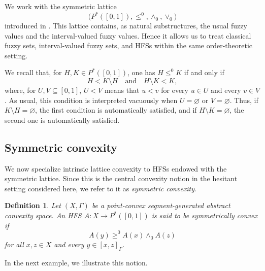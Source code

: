 \documentclass[11pt,a4paper]{article}
\newtheorem{definition}{Definition}
\begin{document}
\smallskip

We work with the symmetric lattice
\[
\bigl(P^*([0,1]),\leq^0,\wedge_0,\vee_0\bigr)
\]
introduced in \citep{JMNS22}. This lattice contains, as natural substructures, the usual fuzzy values and the interval-valued fuzzy values. Hence it allows us to treat classical fuzzy sets, interval-valued fuzzy sets, and HFSs within the same order-theoretic setting.

\smallskip

We recall that, for \(H,K\in P^*([0,1])\), one has \(H\leq^0 K\) if and only if
\[
H<K\setminus H
\quad\text{and}\quad
H\setminus K<K,
\]
where, for \(U,V\subseteq[0,1]\), \(U<V\) means that \(u<v\) for every \(u\in U\) and every \(v\in V\). As usual, this condition is interpreted vacuously when \(U=\varnothing\) or \(V=\varnothing\). Thus, if \(K\setminus H=\varnothing\), the first condition is automatically satisfied, and if \(H\setminus K=\varnothing\), the second one is automatically satisfied.




\subsection{Symmetric convexity}

\smallskip

We now specialize intrinsic lattice convexity to HFSs endowed with the symmetric lattice. Since this is the central convexity notion in the hesitant setting considered here, we refer to it as \emph{symmetric convexity}.

\begin{definition}\label{definition_symmetric-convex}
Let \((X,\Gamma)\) be a point-convex segment-generated abstract convexity space. An HFS \(A:X\to P^*([0,1])\) is said to be \emph{symmetrically convex} if
\[
A(y)\geq^0 A(x)\wedge_0 A(z)
\]
for all \(x,z\in X\) and every \(y\in[x,z]_{\Gamma}\).
\end{definition}


In the next example, we illustrate this notion.
\end{document}
